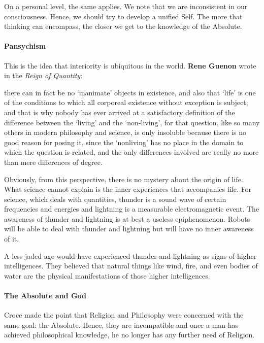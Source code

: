 On a personal level, the same applies. We note that we are inconsistent in our consciousness. Hence, we should try to develop a unified Self. The more that thinking can encompass, the closer we get to the knowledge of the Absolute.

\paragraph{Pansychism}


This is the idea that interiority is ubiquitous in the world.
\textbf{Rene Guenon} wrote in the \emph{Reign of Quantity}:


\begin{quotex}
there can in fact be no `inanimate' objects in existence, and also that `life' is one of the conditions to which all corporeal existence without exception is subject; and that is why nobody has ever arrived at a satisfactory definition of the difference between the `living' and the `non-living', for that question, like so many others in modern philosophy and science, is only insoluble because there is no good reason for posing it, since the `nonliving' has no place in the domain to which the question is related, and the only differences involved are really no more than mere differences of degree.
\end{quotex}


Obviously, from this perspective, there is no mystery about the origin of life. What science cannot explain is the inner experiences that accompanies life. For science, which deals with quantities, thunder is a sound wave of certain frequencies and energies and lightning is a measurable electromagnetic event. The awareness of thunder and lightning is at best a useless epiphenomenon. Robots will be able to deal with thunder and lightning but will have no inner awareness of it.

A less jaded age would have experienced thunder and lightning as signs of higher intelligences. They believed that natural things like wind, fire, and even bodies of water are the physical manifestations of those higher intelligences.

\paragraph{The Absolute and God}


Croce made the point that Religion and Philosophy were concerned with the same goal: the Absolute. Hence, they are incompatible and once a man has achieved philosophical knowledge, he no longer has any further need of Religion.

